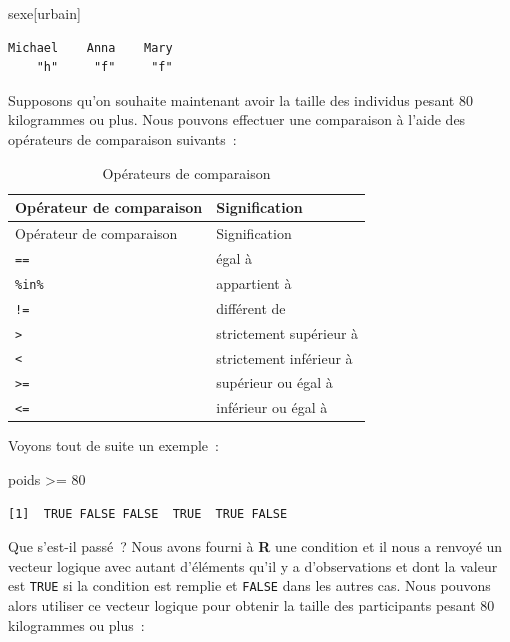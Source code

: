 \documentclass[
  letterpaper,
  DIV=11,
  numbers=noendperiod,
  oneside]{scrreprt}
\newenvironment{Shaded}{\begin{snugshade}}{\end{snugshade}}
\newcommand{\DecValTok}[1]{\textcolor[rgb]{0.68,0.00,0.00}{#1}}
\newcommand{\NormalTok}[1]{\textcolor[rgb]{0.00,0.23,0.31}{#1}}
\newcommand{\SpecialCharTok}[1]{\textcolor[rgb]{0.37,0.37,0.37}{#1}}
\begin{document}
\begin{Shaded}
\begin{Highlighting}[]
\NormalTok{sexe[urbain]}
\end{Highlighting}
\end{Shaded}

\begin{verbatim}
Michael    Anna    Mary 
    "h"     "f"     "f" 
\end{verbatim}

Supposons qu'on souhaite maintenant avoir la taille des individus pesant
80 kilogrammes ou plus. Nous pouvons effectuer une comparaison à l'aide
des opérateurs de comparaison suivants~:

\hypertarget{tbl-operateurs-comparaisons}{}
\begin{longtable}[]{@{}ll@{}}
\caption{\label{tbl-operateurs-comparaisons}Opérateurs de
comparaison}\tabularnewline
\toprule()
Opérateur de comparaison & Signification \\
\midrule()
\endfirsthead
\toprule()
Opérateur de comparaison & Signification \\
\midrule()
\endhead
\texttt{==} & égal à \\
\texttt{\%in\%} & appartient à \\
\texttt{!=} & différent de \\
\texttt{\textgreater{}} & strictement supérieur à \\
\texttt{\textless{}} & strictement inférieur à \\
\texttt{\textgreater{}=} & supérieur ou égal à \\
\texttt{\textless{}=} & inférieur ou égal à \\
\bottomrule()
\end{longtable}

Voyons tout de suite un exemple~:

\begin{Shaded}
\begin{Highlighting}[]
\NormalTok{poids }\SpecialCharTok{\textgreater{}=} \DecValTok{80}
\end{Highlighting}
\end{Shaded}

\begin{verbatim}
[1]  TRUE FALSE FALSE  TRUE  TRUE FALSE
\end{verbatim}

Que s'est-il passé~? Nous avons fourni à \textbf{R} une condition et il
nous a renvoyé un vecteur logique avec autant d'éléments qu'il y a
d'observations et dont la valeur est \texttt{TRUE} si la condition est
remplie et \texttt{FALSE} dans les autres cas. Nous pouvons alors
utiliser ce vecteur logique pour obtenir la taille des participants
pesant 80 kilogrammes ou plus~:
\end{document}

